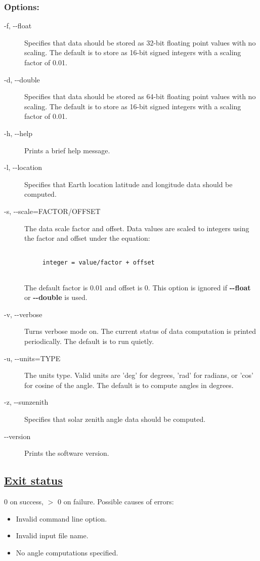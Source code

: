 \subsubsection*{Options:}
\begin{description}
\item[-f, -{-}float]Specifies that data should be stored as 32-bit floating point values with no scaling. The default is to store as 16-bit signed integers with a scaling factor of 0.01.
\item[-d, -{-}double]Specifies that data should be stored as 64-bit floating point values with no scaling. The default is to store as 16-bit signed integers with a scaling factor of 0.01.
\item[-h, -{-}help]Prints a brief help message.
\item[-l, -{-}location]Specifies that Earth location latitude and longitude data should be computed.
\item[-s, -{-}scale=FACTOR/OFFSET]The data scale factor and offset. Data values are scaled to integers using the factor and offset under the equation:\\ 
\begin{verbatim}

     integer = value/factor + offset
   
\end{verbatim}
 The default factor is 0.01 and offset is 0. This option is ignored if \textbf{-{-}float}
 or \textbf{-{-}double}
 is used.
\item[-v, -{-}verbose]Turns verbose mode on. The current status of data computation is printed periodically. The default is to run quietly.
\item[-u, -{-}units=TYPE]The units type. Valid units are 'deg' for degrees, 'rad' for radians, or 'cos' for cosine of the angle. The default is to compute angles in degrees.
\item[-z, -{-}sunzenith]Specifies that solar zenith angle data should be computed.
\item[-{-}version]Prints the software version.

\end{description}
\subsection*{\underline{Exit status}}


 0 on success, $>$ 0 on failure. Possible causes of errors: \begin{itemize}
\item  Invalid command line option. 
\item  Invalid input file name. 
\item  No angle computations specified. 

\end{itemize}

